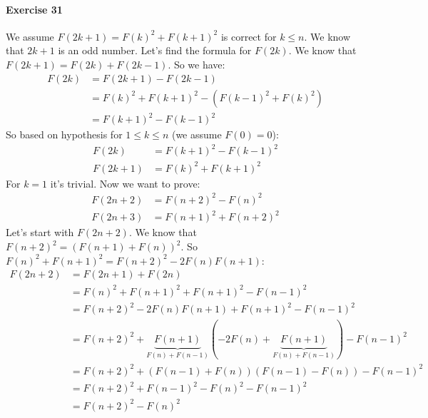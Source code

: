 \documentclass{book}
\begin{document}
	\paragraph{Exercise 31} We assume $F(2k + 1) = {F(k)^2} + {F(k + 1)}^2$ is correct for $k \le n$. We know that $2k + 1$ is an odd number. Let's find the formula for $F(2k)$. We know that $F(2k + 1) = F(2k) + F(2k - 1)$. So we have:
	\begin{equation*}
		\begin{split}
			F(2k) &= F(2k + 1) - F(2k - 1) \\
			&= {F(k)}^2 + {F(k + 1)}^2 - ({F(k - 1)}^2 + {F(k)}^2) \\
			&= F(k +1)^2 - F(k - 1)^2
		\end{split}
	\end{equation*}	
	So based on hypothesis for $1 \le k \le n$ (we assume $F(0) = 0$):
	\begin{equation*}
		\boxed{
		\begin{split}
			F(2k) &= F(k +1)^2 - F(k - 1)^2 \\
			F(2k + 1) &= {F(k)^2} + {F(k + 1)}^2
		\end{split}
		}
	\end{equation*}
	For $k = 1$ it's trivial. Now we want to prove:
	\begin{equation*}
		\boxed{
			\begin{split}
				F(2n + 2) &= F(n + 2)^2 - F(n)^2 \\
				F(2n + 3) &= {F(n + 1)^2} + {F(n + 2)}^2
			\end{split}
		}
	\end{equation*}
	Let's start with $F(2n + 2)$. We know that $F(n + 2)^2 = (F(n + 1) + F(n))^2$. So $F(n)^2 + F(n + 1)^2 = F(n + 2)^2 - 2F(n)F(n + 1)$:
	\begin{equation*}
		\begin{split}
			F(2n + 2) &= F(2n + 1) + F(2n) \\
			&= F(n)^2 + F(n + 1)^2 + F(n + 1)^2 - F(n - 1)^2 \\
			&= F(n + 2)^2 - 2F(n)F(n + 1) + F(n + 1)^2 - F(n - 1)^2 \\
			&= F(n + 2)^2 + \underbrace{F(n + 1)}_{F(n) + F(n - 1)}(-2F(n) + \underbrace{F(n + 1)}_{F(n) + F(n - 1)}) - F(n - 1)^2 \\
			&= F(n + 2)^2 + (F(n - 1) + F(n))(F(n - 1) - F(n)) - F(n - 1)^2 \\
			&= F(n + 2)^2 + F(n - 1)^2 - F(n)^2 - F(n - 1)^2 \\
			&= F(n + 2)^2 - F(n)^2
		\end{split}
	\end{equation*}
\end{document}
